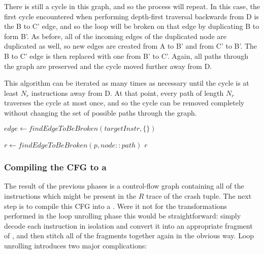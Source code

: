 There is still a cycle in this graph, and so the process will repeat.
In this case, the first cycle encountered when performing depth-first traversal backwards from D is the B to C' edge, and so the loop will be broken on that edge by duplicating B to form B'.
As before, all of the incoming edges of the duplicated node are duplicated as well, so new edges are created from A to B' and from C' to B'.
The B to C' edge is then replaced with one from B' to C'.
Again, all paths through the graph are preserved and the cycle moved further away from D.

This algorithm can be iterated as many times as necessary until the cycle is at least $N_r$ instructions away from D.
At that point, every path of length $N_r$ traverses the cycle at most once, and so the cycle can be removed completely without changing the set of possible paths through the graph.

\begin{algorithmic}
     \STATE $edge \gets findEdgeToBeBroken(targetInstr, \{\})$
     \ELSE
        \ENDFOR
     \ENDIF
  \ENDWHILE
\end{algorithmic}

\begin{algorithmic}
     \ENDIF
     \STATE $r \gets findEdgeToBeBroken(p, node::path)$
         \RETURN $r$
     \ENDIF
  \ENDFOR
\end{algorithmic}



\subsubsection{Compiling the CFG to a \StateMachine}

The result of the previous phases is a control-flow graph containing all of the instructions which might be present in the $R$ trace of the crash tuple.
The next step is to compile this CFG into a \StateMachine.
Were it not for the transformations performed in the loop unrolling phase this would be straightforward: simply decode each instruction in isolation and convert it into an appropriate fragment of \StateMachine, and then stitch all of the fragments together again in the obvious way.
Loop unrolling introduces two major complications:


